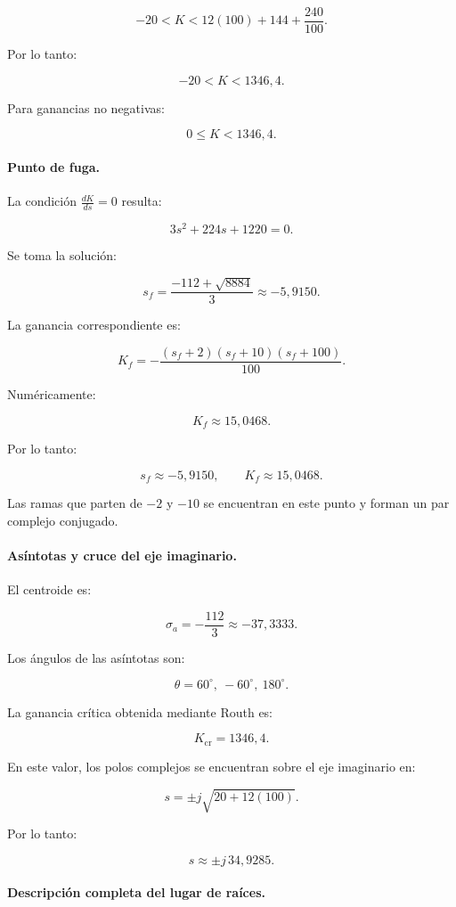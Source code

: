 \documentclass[12pt,a4paper]{article}
\begin{document}
\[
-20
<
K
<
12(100)+144+\frac{240}{100}.
\]

Por lo tanto:

\[
\boxed{
-20<K<1346{,}4.
}
\]

Para ganancias no negativas:

\[
\boxed{
0\leq K<1346{,}4.
}
\]


\paragraph{Punto de fuga.}

La condición $\frac{dK}{ds}=0$ resulta:

\[
3s^2+224s+1220=0.
\]

Se toma la solución:

\[
\boxed{
s_f
=
\frac{-112+\sqrt{8884}}{3}
\approx-5{,}9150.
}
\]

La ganancia correspondiente es:

\[
K_f
=
-\frac{
(s_f+2)(s_f+10)(s_f+100)
}{
100
}.
\]

Numéricamente:

\[
\boxed{
K_f\approx15{,}0468.
}
\]

Por lo tanto:

\[
\boxed{
s_f\approx-5{,}9150,
\qquad
K_f\approx15{,}0468.
}
\]

Las ramas que parten de $-2$ y $-10$ se encuentran
en este punto y forman un par complejo conjugado.


\paragraph{Asíntotas y cruce del eje imaginario.}

El centroide es:

\[
\boxed{
\sigma_a
=
-\frac{112}{3}
\approx-37{,}3333.
}
\]

Los ángulos de las asíntotas son:

\[
\boxed{
\theta=60^\circ,\ -60^\circ,\ 180^\circ.
}
\]

La ganancia crítica obtenida mediante Routh es:

\[
\boxed{
K_{\mathrm{cr}}=1346{,}4.
}
\]

En este valor, los polos complejos se encuentran sobre
el eje imaginario en:

\[
s
=
\pm j\sqrt{20+12(100)}.
\]

Por lo tanto:

\[
\boxed{
s\approx\pm j\,34{,}9285.
}
\]


\paragraph{Descripción completa del lugar de raíces.}
\end{document}
